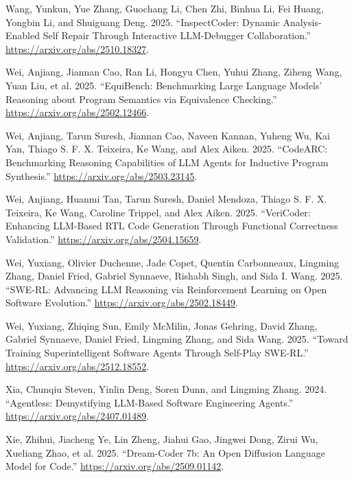 \documentclass{article}
\newlength{\cslhangindent}
\newenvironment{CSLReferences}[2]
 {%
  \setlength{\parindent}{0pt}
  \everypar{\setlength{\hangindent}{\cslhangindent}}\ignorespaces
 }
 {\par}
\begin{document}
\begin{CSLReferences}{1}{0}
\leavevmode{}%
Wang, Yunkun, Yue Zhang, Guochang Li, Chen Zhi, Binhua Li, Fei Huang,
Yongbin Li, and Shuiguang Deng. 2025. {``InspectCoder: Dynamic
Analysis-Enabled Self Repair Through Interactive LLM-Debugger
Collaboration.''} \url{https://arxiv.org/abs/2510.18327}.

\leavevmode{}%
Wei, Anjiang, Jiannan Cao, Ran Li, Hongyu Chen, Yuhui Zhang, Ziheng
Wang, Yuan Liu, et al. 2025. {``EquiBench: Benchmarking Large Language
Models' Reasoning about Program Semantics via Equivalence Checking.''}
\url{https://arxiv.org/abs/2502.12466}.

\leavevmode{}%
Wei, Anjiang, Tarun Suresh, Jiannan Cao, Naveen Kannan, Yuheng Wu, Kai
Yan, Thiago S. F. X. Teixeira, Ke Wang, and Alex Aiken. 2025.
{``CodeARC: Benchmarking Reasoning Capabilities of LLM Agents for
Inductive Program Synthesis.''} \url{https://arxiv.org/abs/2503.23145}.

\leavevmode{}%
Wei, Anjiang, Huanmi Tan, Tarun Suresh, Daniel Mendoza, Thiago S. F. X.
Teixeira, Ke Wang, Caroline Trippel, and Alex Aiken. 2025. {``VeriCoder:
Enhancing LLM-Based RTL Code Generation Through Functional Correctness
Validation.''} \url{https://arxiv.org/abs/2504.15659}.

\leavevmode{}%
Wei, Yuxiang, Olivier Duchenne, Jade Copet, Quentin Carbonneaux,
Lingming Zhang, Daniel Fried, Gabriel Synnaeve, Rishabh Singh, and Sida
I. Wang. 2025. {``SWE-RL: Advancing LLM Reasoning via Reinforcement
Learning on Open Software Evolution.''}
\url{https://arxiv.org/abs/2502.18449}.

\leavevmode{}%
Wei, Yuxiang, Zhiqing Sun, Emily McMilin, Jonas Gehring, David Zhang,
Gabriel Synnaeve, Daniel Fried, Lingming Zhang, and Sida Wang. 2025.
{``Toward Training Superintelligent Software Agents Through Self-Play
SWE-RL.''} \url{https://arxiv.org/abs/2512.18552}.

\leavevmode{}%
Xia, Chunqiu Steven, Yinlin Deng, Soren Dunn, and Lingming Zhang. 2024.
{``Agentless: Demystifying LLM-Based Software Engineering Agents.''}
\url{https://arxiv.org/abs/2407.01489}.

\leavevmode{}%
Xie, Zhihui, Jiacheng Ye, Lin Zheng, Jiahui Gao, Jingwei Dong, Zirui Wu,
Xueliang Zhao, et al. 2025. {``Dream-Coder 7b: An Open Diffusion
Language Model for Code.''} \url{https://arxiv.org/abs/2509.01142}.


\end{CSLReferences}
\end{document}
